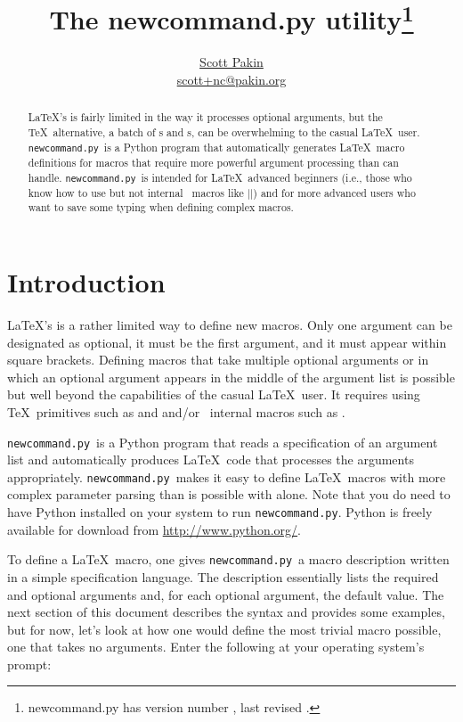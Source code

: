 \documentclass{ltxdoc}
\title{The \textsf{newcommand.py} utility\thanks{\textsf{newcommand.py}
         has version number \ncfileversion, last revised \ncfiledate.}}
\author{\href{mailto:scott+nc@pakin.org}{Scott Pakin} \\
        \href{mailto:scott+nc@pakin.org}{scott+nc@pakin.org}}
\date{\ncfiledate}
\newcommand*{\ncpy}{\texttt{newcommand.py}}      %
\begin{document}
\maketitle
\sloppy

\begin{abstract}
  \LaTeX's  is fairly limited in the way it processes
  optional arguments, but the \TeX\ alternative, a batch of s
  and s, can be overwhelming to the casual \LaTeX\ user.
  \ncpy\ is a Python program that automatically generates
  \LaTeX\ macro definitions for macros that require more powerful
  argument processing than  can handle.  \ncpy\ is
  intended for \LaTeX\ advanced beginners (i.e., those who know how to
  use  but not internal \LaTeXe\ macros like
  |\@ifnextchar|) and for more advanced users who want to save some
  typing when defining complex macros.
\end{abstract}

\section{Introduction}

\LaTeX's  is a rather limited way to define new macros.
Only one argument can be designated as optional, it must be the first
argument, and it must appear within square brackets.  Defining macros
that take multiple optional arguments or in which an optional argument
appears in the middle of the argument list is possible but well beyond
the capabilities of the casual \LaTeX\ user.  It requires using
\TeX\ primitives such as  and  and/or
\LaTeXe\ internal macros such as .

\ncpy\ is a Python program that reads a specification of an argument
list and automatically produces \LaTeX\ code that processes the
arguments appropriately.  \ncpy\ makes it easy to define
\LaTeX\ macros with more complex parameter parsing than is possible
with  alone.  Note that you do need to have Python
installed on your system to run \ncpy.  Python is freely available for
download from \url{http://www.python.org/}.

To define a \LaTeX\ macro, one gives \ncpy\ a macro description
written in a simple specification language.  The description
essentially lists the required and optional arguments and, for each
optional argument, the default value.  The next section of this
document describes the syntax and provides some examples, but for now,
let's look at how one would define the most trivial macro possible,
one that takes no arguments.  Enter the following at your operating
system's prompt:
\end{document}
